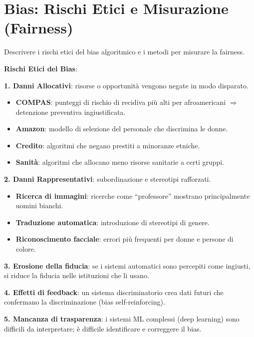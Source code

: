 \documentclass[a4paper,11pt]{article}
\begin{document}
\section{Bias: Rischi Etici e Misurazione (Fairness)}

\begin{domanda}
Descrivere i rischi etici del bias algoritmico e i metodi per misurare la fairness.
\end{domanda}

\textbf{Rischi Etici del Bias}:

\textbf{1. Danni Allocativi}: risorse o opportunit\`{a} vengono negate in modo disparato.
\begin{itemize}
  \item \textbf{COMPAS}: punteggi di rischio di recidiva pi\`{u} alti per afroamericani $\Rightarrow$ detenzione preventiva ingiustificata.
  \item \textbf{Amazon}: modello di selezione del personale che discrimina le donne.
  \item \textbf{Credito}: algoritmi che negano prestiti a minoranze etniche.
  \item \textbf{Sanit\`{a}}: algoritmi che allocano meno risorse sanitarie a certi gruppi.
\end{itemize}

\textbf{2. Danni Rappresentativi}: subordinazione e stereotipi rafforzati.
\begin{itemize}
  \item \textbf{Ricerca di immagini}: ricerche come ``professore'' mostrano principalmente uomini bianchi.
  \item \textbf{Traduzione automatica}: introduzione di stereotipi di genere.
  \item \textbf{Riconoscimento facciale}: errori pi\`{u} frequenti per donne e persone di colore.
\end{itemize}

\textbf{3. Erosione della fiducia}: se i sistemi automatici sono percepiti come ingiusti, si riduce la fiducia nelle istituzioni che li usano.

\textbf{4. Effetti di feedback}: un sistema discriminatorio crea dati futuri che confermano la discriminazione (bias self-reinforcing).

\textbf{5. Mancanza di trasparenza}: i sistemi ML complessi (deep learning) sono difficili da interpretare; \`{e} difficile identificare e correggere il bias.
\end{document}
